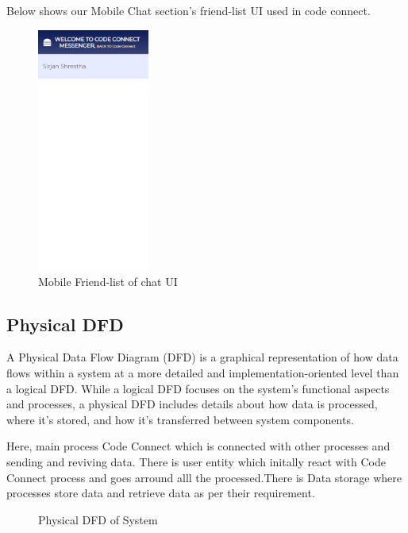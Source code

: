 \newpage
Below shows our Mobile Chat section's friend-list UI used in code connect.
\begin{figure}[H]
  \centering
  \includegraphics[height = 8cm]{Outcome-ss/moble-chat-friends.png}
  \caption{Mobile Friend-list of chat UI}
\end{figure}
\newpage
\subsection{Physical DFD}
A Physical Data Flow Diagram (DFD) is a graphical representation of how data flows within a system at a more detailed and implementation-oriented level than a logical DFD. While a logical DFD focuses on the system's functional aspects and processes, a physical DFD includes details about how data is processed, where it's stored, and how it's transferred between system components.

Here, main process Code Connect which is connected with other processes and sending and reviving data. There is user entity which initally react with Code Connect process and goes arround alll the processed.There is Data storage where processes store data and retrieve data as per their requirement.

\begin{figure}[H]
  \caption{Physical DFD of System}
\end{figure}
\newpage
